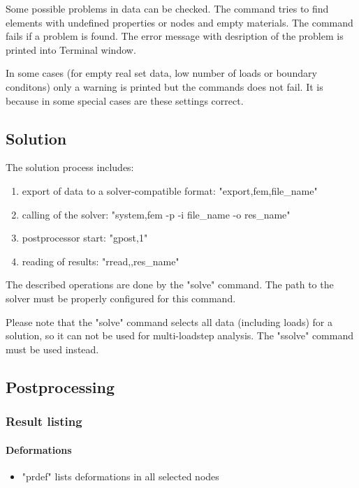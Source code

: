 \documentclass{article}
\begin{document}
 Some possible problems in data can be checked. The command
 tries to find elements with undefined properties or nodes
 and empty materials. The command fails if a problem is
 found. The error message with desription of the problem is
 printed into Terminal window.

 In some cases (for empty real set 
 data, low number of loads or boundary conditons) only a
 warning is printed but the commands does not fail. It is
 because in some special cases are these settings correct.



\subsection{Solution}

 The solution process includes:


\begin{enumerate}
\item  export of data to a solver-compatible format: "export,fem,file\_name"
\item  calling of the solver: "system,fem -p -i file\_name -o res\_name"
\item  postprocessor start: "gpost,1"
\item  reading of results: "rread,,res\_name"
\end{enumerate}

 The described operations are done by the "solve" command. The path
 to the solver must be properly configured for this command.

 Please note that the "solve" command selects all data (including
 loads) for a solution, so it can not be used for multi-loadstep
 analysis. The "ssolve" command must be used instead.



\subsection{Postprocessing}

\subsubsection{Result listing}

\paragraph{Deformations}
\begin{itemize}
\item  "prdef" lists deformations in all selected nodes
\end{itemize}
\end{document}
